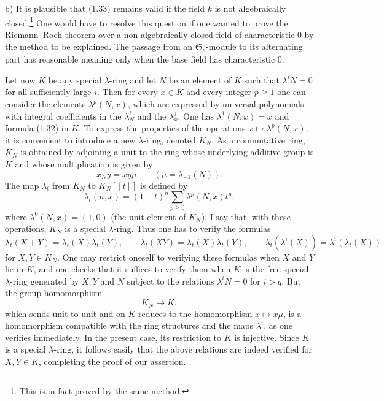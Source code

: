 \documentclass[11pt]{article}
\begin{document}
b) It is plausible that (1.33) remains valid if the field $k$ is not algebraically closed.\footnote{This is in fact proved by the same method.} One would have to resolve this question if one wanted to prove the Riemann--Roch theorem over a non-algebraically-closed field of characteristic $0$ by the method to be explained. The passage from an $\mathfrak S_p$-module to its alternating part has reasonable meaning only when the base field has characteristic $0$.

Let now $K$ be any special $\lambda$-ring and let $N$ be an element of $K$ such that $\lambda^iN=0$ for all sufficiently large $i$. Then for every $x\in K$ and every integer $p\geq 1$ one can consider the elements $\lambda^p(N,x)$, which are expressed by universal polynomials with integral coefficients in the $\lambda_N^i$ and the $\lambda_x^j$. One has $\lambda^1(N,x)=x$ and formula (1.32) in $K$. To express the properties of the operations $x\mapsto\lambda^p(N,x)$, it is convenient to introduce a new $\lambda$-ring, denoted $K_N$. As a commutative ring, $K_N$ is obtained by adjoining a unit to the ring whose underlying additive group is $K$ and whose multiplication is given by
\begin{equation}\tag{1.34}
x_Ny=xy\mu\qquad(\mu=\lambda_{-1}(N)).
\end{equation}
The map $\lambda_t$ from $K_N$ to $K_N[[t]]$ is defined by
\begin{equation}\tag{1.35}
\lambda_t(n,x)=(1+t)^n\sum_{p\geq 0}\lambda^p(N,x)t^p,
\end{equation}
where $\lambda^0(N,x)=(1,0)$ (the unit element of $K_N$). I say that, with these operations, $K_N$ is a special $\lambda$-ring. Thus one has to verify the formulas
\[
\lambda_t(X+Y)=\lambda_t(X)\lambda_t(Y),\qquad
\lambda_t(XY)=\lambda_t(X)\lambda_t(Y),\qquad
\lambda_t(\lambda^i(X))=\lambda^i(\lambda_t(X))
\]
for $X,Y\in K_N$. One may restrict oneself to verifying these formulas when $X$ and $Y$ lie in $K$, and one checks that it suffices to verify them when $K$ is the free special $\lambda$-ring generated by $X,Y$ and $N$ subject to the relations $\lambda^iN=0$ for $i>q$. But the group homomorphism
\begin{equation}\tag{1.36}
K_N\longrightarrow K,
\end{equation}
which sends unit to unit and on $K$ reduces to the homomorphism $x\mapsto x\mu$, is a homomorphism compatible with the ring structures and the maps $\lambda^i$, as one verifies immediately. In the present case, its restriction to $K$ is injective. Since $K$ is a special $\lambda$-ring, it follows easily that the above relations are indeed verified for $X,Y\in K$, completing the proof of our assertion.
\end{document}
